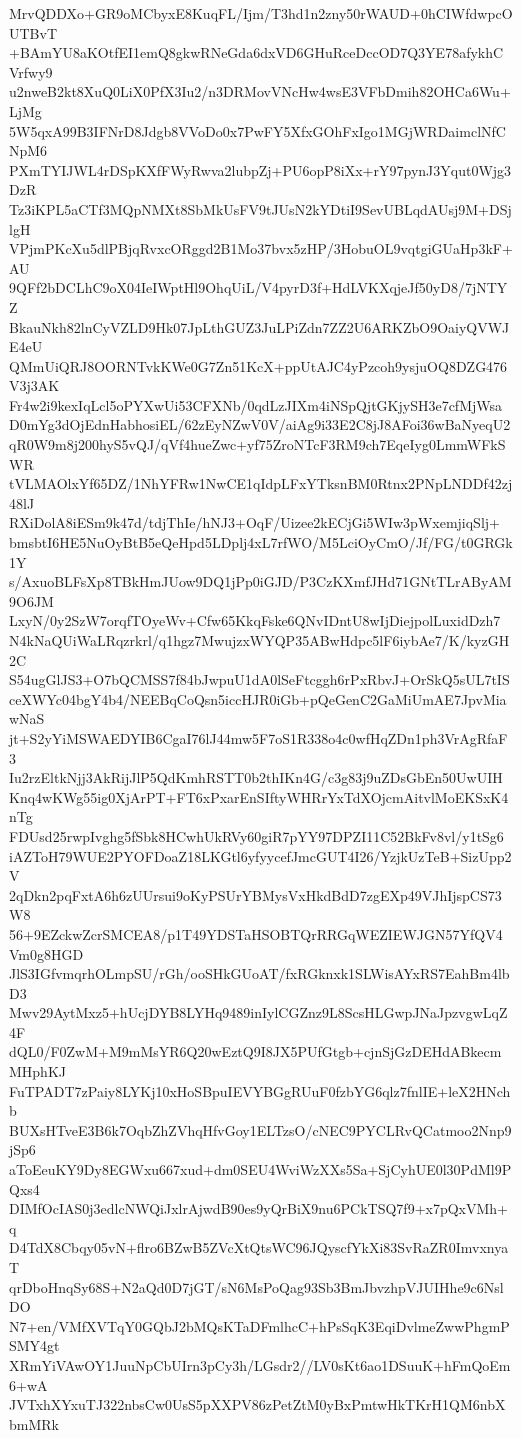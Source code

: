 MrvQDDXo+GR9oMCbyxE8KuqFL/Ijm/T3hd1n2zny50rWAUD+0hCIWfdwpcOUTBvT
+BAmYU8aKOtfEI1emQ8gkwRNeGda6dxVD6GHuRceDccOD7Q3YE78afykhCVrfwy9
u2nweB2kt8XuQ0LiX0PfX3Iu2/n3DRMovVNcHw4wsE3VFbDmih82OHCa6Wu+LjMg
5W5qxA99B3IFNrD8Jdgb8VVoDo0x7PwFY5XfxGOhFxIgo1MGjWRDaimclNfCNpM6
PXmTYIJWL4rDSpKXfFWyRwva2lubpZj+PU6opP8iXx+rY97pynJ3Yqut0Wjg3DzR
Tz3iKPL5aCTf3MQpNMXt8SbMkUsFV9tJUsN2kYDtiI9SevUBLqdAUsj9M+DSjlgH
VPjmPKcXu5dlPBjqRvxcORggd2B1Mo37bvx5zHP/3HobuOL9vqtgiGUaHp3kF+AU
9QFf2bDCLhC9oX04IeIWptHl9OhqUiL/V4pyrD3f+HdLVKXqjeJf50yD8/7jNTYZ
BkauNkh82lnCyVZLD9Hk07JpLthGUZ3JuLPiZdn7ZZ2U6ARKZbO9OaiyQVWJE4eU
QMmUiQRJ8OORNTvkKWe0G7Zn51KcX+ppUtAJC4yPzcoh9ysjuOQ8DZG476V3j3AK
Fr4w2i9kexIqLcl5oPYXwUi53CFXNb/0qdLzJIXm4iNSpQjtGKjySH3e7cfMjWsa
D0mYg3dOjEdnHabhosiEL/62zEyNZwV0V/aiAg9i33E2C8jJ8AFoi36wBaNyeqU2
qR0W9m8j200hyS5vQJ/qVf4hueZwc+yf75ZroNTcF3RM9ch7EqeIyg0LmmWFkSWR
tVLMAOlxYf65DZ/1NhYFRw1NwCE1qIdpLFxYTksnBM0Rtnx2PNpLNDDf42zj48lJ
RXiDolA8iESm9k47d/tdjThIe/hNJ3+OqF/Uizee2kECjGi5WIw3pWxemjiqSlj+
bmsbtI6HE5NuOyBtB5eQeHpd5LDplj4xL7rfWO/M5LciOyCmO/Jf/FG/t0GRGk1Y
s/AxuoBLFsXp8TBkHmJUow9DQ1jPp0iGJD/P3CzKXmfJHd71GNtTLrAByAM9O6JM
LxyN/0y2SzW7orqfTOyeWv+Cfw65KkqFske6QNvIDntU8wIjDiejpolLuxidDzh7
N4kNaQUiWaLRqzrkrl/q1hgz7MwujzxWYQP35ABwHdpc5lF6iybAe7/K/kyzGH2C
S54ugGlJS3+O7bQCMSS7f84bJwpuU1dA0lSeFtcggh6rPxRbvJ+OrSkQ5sUL7tIS
ceXWYc04bgY4b4/NEEBqCoQsn5iccHJR0iGb+pQeGenC2GaMiUmAE7JpvMiawNaS
jt+S2yYiMSWAEDYIB6CgaI76lJ44mw5F7oS1R338o4c0wfHqZDn1ph3VrAgRfaF3
Iu2rzEltkNjj3AkRijJlP5QdKmhRSTT0b2thIKn4G/c3g83j9uZDsGbEn50UwUIH
Knq4wKWg55ig0XjArPT+FT6xPxarEnSIftyWHRrYxTdXOjcmAitvlMoEKSxK4nTg
FDUsd25rwpIvghg5fSbk8HCwhUkRVy60giR7pYY97DPZI11C52BkFv8vl/y1tSg6
iAZToH79WUE2PYOFDoaZ18LKGtl6yfyycefJmcGUT4I26/YzjkUzTeB+SizUpp2V
2qDkn2pqFxtA6h6zUUrsui9oKyPSUrYBMysVxHkdBdD7zgEXp49VJhIjspCS73W8
56+9EZckwZcrSMCEA8/p1T49YDSTaHSOBTQrRRGqWEZIEWJGN57YfQV4Vm0g8HGD
JlS3IGfvmqrhOLmpSU/rGh/ooSHkGUoAT/fxRGknxk1SLWisAYxRS7EahBm4lbD3
Mwv29AytMxz5+hUcjDYB8LYHq9489inIylCGZnz9L8ScsHLGwpJNaJpzvgwLqZ4F
dQL0/F0ZwM+M9mMsYR6Q20wEztQ9I8JX5PUfGtgb+cjnSjGzDEHdABkecmMHphKJ
FuTPADT7zPaiy8LYKj10xHoSBpuIEVYBGgRUuF0fzbYG6qlz7fnlIE+leX2HNchb
BUXsHTveE3B6k7OqbZhZVhqHfvGoy1ELTzsO/cNEC9PYCLRvQCatmoo2Nnp9jSp6
aToEeuKY9Dy8EGWxu667xud+dm0SEU4WviWzXXs5Sa+SjCyhUE0l30PdMl9PQxs4
DIMfOcIAS0j3edlcNWQiJxlrAjwdB90es9yQrBiX9nu6PCkTSQ7f9+x7pQxVMh+q
D4TdX8Cbqy05vN+flro6BZwB5ZVcXtQtsWC96JQyscfYkXi83SvRaZR0ImvxnyaT
qrDboHnqSy68S+N2aQd0D7jGT/sN6MsPoQag93Sb3BmJbvzhpVJUIHhe9c6NslDO
N7+en/VMfXVTqY0GQbJ2bMQsKTaDFmlhcC+hPsSqK3EqiDvlmeZwwPhgmPSMY4gt
XRmYiVAwOY1JuuNpCbUIrn3pCy3h/LGsdr2//LV0sKt6ao1DSuuK+hFmQoEm6+wA
JVTxhXYxuTJ322nbsCw0UsS5pXXPV86zPetZtM0yBxPmtwHkTKrH1QM6nbXbmMRk
